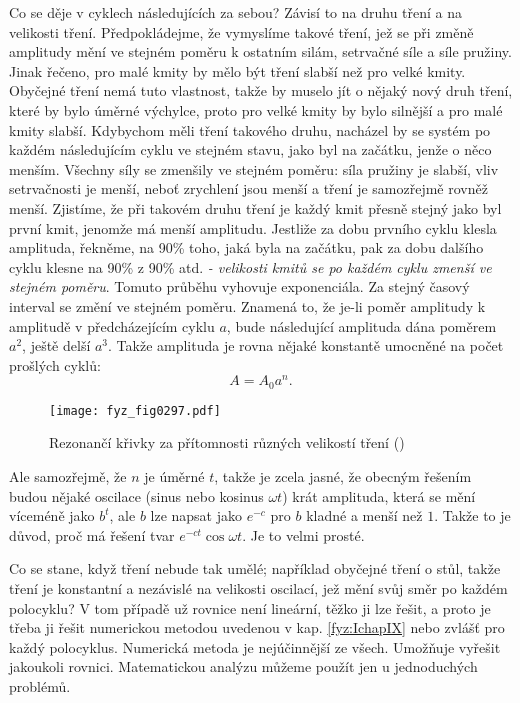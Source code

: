     Co se děje v cyklech následujících za sebou? Závisí to na druhu tření a na velikosti tření. 
    Předpokládejme, že vymyslíme takové tření, jež se při změně amplitudy mění ve stejném poměru k 
    ostatním silám, setrvačné síle a síle pružiny. Jinak řečeno, pro malé kmity by mělo být tření 
    slabší než pro velké kmity. Obyčejné tření nemá tuto vlastnost, takže by muselo jít o nějaký 
    nový druh tření, které by bylo úměrné výchylce, proto pro velké kmity by bylo silnější a pro 
    malé kmity slabší. Kdybychom měli tření takového druhu, nacházel by se systém po každém 
    následujícím cyklu ve stejném stavu, jako byl na začátku, jenže o něco menším. Všechny síly se 
    zmenšily ve stejném poměru: síla pružiny je slabší, vliv setrvačnosti je menší, neboť zrychlení 
    jsou menší a tření je samozřejmě rovněž menší. Zjistíme, že při takovém druhu tření je každý 
    kmit přesně stejný jako byl první kmit, jenomže má menší amplitudu. Jestliže za dobu prvního 
    cyklu klesla amplituda, řekněme, na 90\% toho, jaká byla na začátku, pak za dobu dalšího cyklu 
    klesne na 90\% z 90\% atd. \emph{- velikosti kmitů se po každém cyklu zmenší ve stejném 
    poměru}. Tomuto průběhu vyhovuje exponenciála. Za stejný časový interval se změní ve stejném 
    poměru. Znamená to, že je-li poměr amplitudy k amplitudě v předcházejícím cyklu \(a\), bude 
    následující amplituda dána poměrem \(a^2\), ještě delší \(a^3\). Takže amplituda je rovna 
    nějaké konstantě umocněné na počet prošlých cyklů:
    \begin{equation}\label{fyz:eq347}
      A = A_0a^n.
    \end{equation}

    \begin{figure}[ht!] %
      \centering
      \texttt{[image: fyz\_fig0297.pdf]}
      \caption{Rezonančí křivky za přítomnosti různých velikostí tření 
               (\cite[s.~427]{Feynman01})}
      \label{fyz:fig0297}
    \end{figure}
    
    Ale samozřejmě, že \(n\) je úměrné \(t\), takže je zcela jasné, že obecným řešením budou nějaké 
    oscilace (sinus nebo kosinus \(\omega t\)) krát amplituda, která se mění víceméně jako \(b^t\), 
    ale \(b\) lze napsat jako \(e^{-c}\) pro \(b\) kladné a menší než \(1\). Takže to je důvod, 
    proč má řešení tvar \(e^{-ct}\cos\omega t\). Je to velmi prosté.
    
    Co se stane, když tření nebude tak umělé; například obyčejné tření o stůl, takže tření je 
    konstantní a nezávislé na velikosti oscilací, jež mění svůj směr po každém polocyklu? V tom 
    případě už rovnice není lineární, těžko ji lze řešit, a proto je třeba ji řešit numerickou 
    metodou uvedenou v kap. \ref{fyz:IchapIX} nebo zvlášť pro každý polocyklus. Numerická metoda je 
    nejúčinnější ze všech. Umožňuje vyřešit jakoukoli rovnici. Matematickou analýzu můžeme použít 
    jen u jednoduchých problémů.
    

